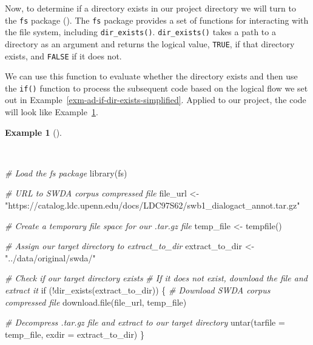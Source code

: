 \documentclass[
  letterpaper,
  DIV=11,
  numbers=noendperiod]{scrreprt}
\newenvironment{Shaded}{\begin{snugshade}}{\end{snugshade}}
\newcommand{\AttributeTok}[1]{\textcolor[rgb]{0.00,0.00,0.00}{#1}}
\newcommand{\CommentTok}[1]{\textcolor[rgb]{0.00,0.00,0.00}{\textit{#1}}}
\newcommand{\ControlFlowTok}[1]{\textcolor[rgb]{0.00,0.00,0.00}{#1}}
\newcommand{\FunctionTok}[1]{\textcolor[rgb]{0.00,0.00,0.00}{#1}}
\newcommand{\NormalTok}[1]{\textcolor[rgb]{0.00,0.00,0.00}{#1}}
\newcommand{\OtherTok}[1]{\textcolor[rgb]{0.00,0.00,0.00}{#1}}
\newcommand{\SpecialCharTok}[1]{\textcolor[rgb]{0.00,0.00,0.00}{#1}}
\newcommand{\StringTok}[1]{\textcolor[rgb]{0.00,0.00,0.00}{#1}}
\theoremstyle{definition}
\newtheorem{example}{Example}[chapter]
\theoremstyle{remark}
\begin{document}
Now, to determine if a directory exists in our project directory we will
turn to the \texttt{fs} package (). The \texttt{fs} package provides a set of functions
for interacting with the file system, including \texttt{dir\_exists()}.
\texttt{dir\_exists()} takes a path to a directory as an argument and
returns the logical value, \texttt{TRUE}, if that directory exists, and
\texttt{FALSE} if it does not.

We can use this function to evaluate whether the directory exists and
then use the \texttt{if()} function to process the subsequent code based
on the logical flow we set out in
Example~\ref{exm-ad-if-dir-exists-simplified}. Applied to our project,
the code will look like Example~\ref{exm-ad-swda-if-dir-exists}.

\begin{example}[]\protect\hypertarget{exm-ad-swda-if-dir-exists}{}\label{exm-ad-swda-if-dir-exists}

~

\begin{Shaded}
\begin{Highlighting}[]
\CommentTok{\# Load the \textasciigrave{}fs\textasciigrave{} package}
\FunctionTok{library}\NormalTok{(fs)}

\CommentTok{\# URL to SWDA corpus compressed file}
\NormalTok{file\_url }\OtherTok{\textless{}{-}}
  \StringTok{"https://catalog.ldc.upenn.edu/docs/LDC97S62/swb1\_dialogact\_annot.tar.gz"}

\CommentTok{\# Create a temporary file space for our .tar.gz file}
\NormalTok{temp\_file }\OtherTok{\textless{}{-}} \FunctionTok{tempfile}\NormalTok{()}

\CommentTok{\# Assign our target directory to \textasciigrave{}extract\_to\_dir\textasciigrave{}}
\NormalTok{extract\_to\_dir }\OtherTok{\textless{}{-}} \StringTok{"../data/original/swda/"}

\CommentTok{\# Check if our target directory exists}
\CommentTok{\# If it does not exist, download the file and extract it}
\ControlFlowTok{if}\NormalTok{ (}\SpecialCharTok{!}\FunctionTok{dir\_exists}\NormalTok{(extract\_to\_dir)) \{}
  \CommentTok{\# Download SWDA corpus compressed file}
  \FunctionTok{download.file}\NormalTok{(file\_url, temp\_file)}

  \CommentTok{\# Decompress .tar.gz file and extract to our target directory}
  \FunctionTok{untar}\NormalTok{(}\AttributeTok{tarfile =}\NormalTok{ temp\_file, }\AttributeTok{exdir =}\NormalTok{ extract\_to\_dir)}
\NormalTok{\}}
\end{Highlighting}
\end{Shaded}

\end{example}
\end{document}
